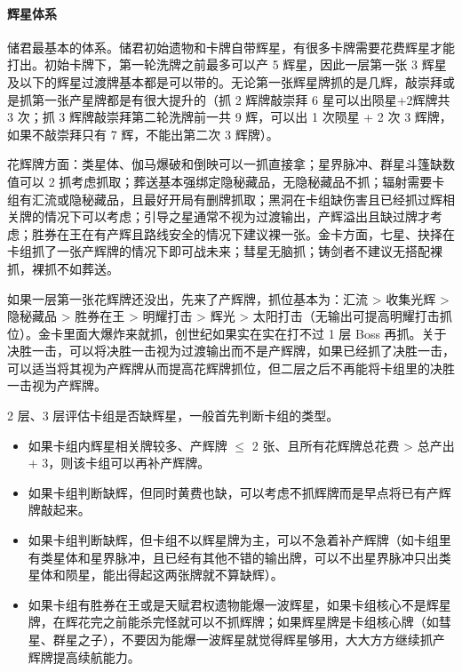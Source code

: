 \documentclass[12pt, a4paper]{article}
\begin{document}
\paragraph{辉星体系}
储君最基本的体系。储君初始遗物和卡牌自带辉星，有很多卡牌需要花费辉星才能打出。初始卡牌下，第一轮洗牌之前最多可以产 5 辉星，因此一层第一张 3 辉星及以下的辉星过渡牌基本都是可以带的。无论第一张辉星牌抓的是几辉，敲崇拜或是抓第一张产星牌都是有很大提升的（抓 2 辉牌敲崇拜 6 星可以出陨星+2辉牌共 3 次；抓 3 辉牌敲崇拜第二轮洗牌前一共 9 辉，可以出 1 次陨星 + 2 次 3 辉牌，如果不敲崇拜只有 7 辉，不能出第二次 3 辉牌）。

花辉牌方面：类星体、伽马爆破和倒映可以一抓直接拿；星界脉冲、群星斗篷缺数值可以 2 抓考虑抓取；葬送基本强绑定隐秘藏品，无隐秘藏品不抓；辐射需要卡组有汇流或隐秘藏品，且最好开局有删牌抓取；黑洞在卡组缺伤害且已经抓过辉相关牌的情况下可以考虑；引导之星通常不视为过渡输出，产辉溢出且缺过牌才考虑；胜券在王在有产辉且路线安全的情况下建议裸一张。金卡方面，七星、抉择在卡组抓了一张产辉牌的情况下即可战未来；彗星无脑抓；铸剑者不建议无搭配裸抓，裸抓不如葬送。

如果一层第一张花辉牌还没出，先来了产辉牌，抓位基本为：汇流 \textgreater{} 收集光辉 \textgreater{} 隐秘藏品 \textgreater{} 胜券在王 \textgreater{} 明耀打击 \textgreater{} 辉光 \textgreater{} 太阳打击（无输出可提高明耀打击抓位）。金卡里面大爆炸来就抓，创世纪如果实在实在打不过 1 层 Boss 再抓。关于决胜一击，可以将决胜一击视为过渡输出而不是产辉牌，如果已经抓了决胜一击，可以适当将其视为产辉牌从而提高花辉牌抓位，但二层之后不再能将卡组里的决胜一击视为产辉牌。

2 层、3 层评估卡组是否缺辉星，一般首先判断卡组的类型。
\begin{itemize}
    \item 如果卡组内辉星相关牌较多、产辉牌 $\le$ 2 张、且所有花辉牌总花费 \textgreater{} 总产出 + 3，则该卡组可以再补产辉牌。
    \item 如果卡组判断缺辉，但同时黄费也缺，可以考虑不抓辉牌而是早点将已有产辉牌敲起来。
    \item 如果卡组判断缺辉，但卡组不以辉星牌为主，可以不急着补产辉牌（如卡组里有类星体和星界脉冲，且已经有其他不错的输出牌，可以不出星界脉冲只出类星体和陨星，能出得起这两张牌就不算缺辉）。
    \item 如果卡组有胜券在王或是天赋君权遗物能爆一波辉星，如果卡组核心不是辉星牌，在辉花完之前能杀完怪就可以不抓辉牌；如果辉星牌是卡组核心牌（如彗星、群星之子），不要因为能爆一波辉星就觉得辉星够用，大大方方继续抓产辉牌提高续航能力。
\end{itemize}
\end{document}
